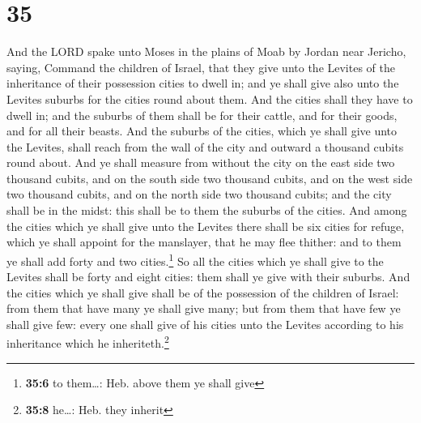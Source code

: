 \hypertarget{section-34}{%
\section{35}\label{section-34}}

 And the LORD spake unto Moses in the plains of Moab by
Jordan near Jericho, saying,  Command the children of
Israel, that they give unto the Levites of the inheritance of their
possession cities to dwell in; and ye shall give also unto the Levites
suburbs for the cities round about them.  And the cities
shall they have to dwell in; and the suburbs of them shall be for their
cattle, and for their goods, and for all their beasts. 
And the suburbs of the cities, which ye shall give unto the Levites,
shall reach from the wall of the city and outward a thousand cubits
round about.  And ye shall measure from without the city
on the east side two thousand cubits, and on the south side two thousand
cubits, and on the west side two thousand cubits, and on the north side
two thousand cubits; and the city shall be in the midst: this shall be
to them the suburbs of the cities.  And among the cities
which ye shall give unto the Levites there shall be six cities for
refuge, which ye shall appoint for the manslayer, that he may flee
thither: and to them ye shall add forty and two cities.\footnote{\textbf{35:6}
  to them\ldots: Heb. above them ye shall give}  So all
the cities which ye shall give to the Levites shall be forty and eight
cities: them shall ye give with their suburbs.  And the
cities which ye shall give shall be of the possession of the children of
Israel: from them that have many ye shall give many; but from them that
have few ye shall give few: every one shall give of his cities unto the
Levites according to his inheritance which he inheriteth.\footnote{\textbf{35:8}
  he\ldots: Heb. they inherit}

